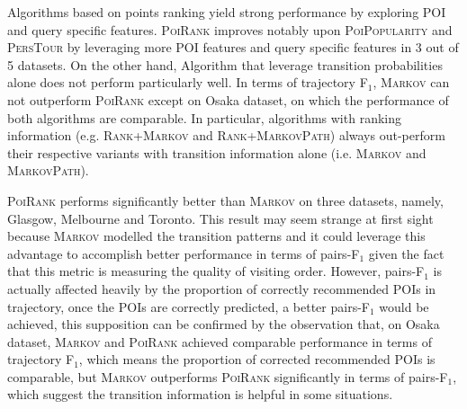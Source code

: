 Algorithms based on points ranking yield strong performance
by exploring POI and query specific features.
%
\textsc{PoiRank} improves notably upon \textsc{PoiPopularity} and \textsc{PersTour}
 by leveraging more POI features and query specific features in 3 out of 5 datasets.
On the other hand, Algorithm that leverage transition probabilities alone does not perform particularly well.
%
In terms of trajectory F$_1$,
\textsc{Markov} can not outperform \textsc{PoiRank} except on Osaka dataset,
on which the performance of both algorithms are comparable.
In particular, algorithms with ranking information (e.g. \textsc{Rank+Markov} and \textsc{Rank+MarkovPath}) always out-perform their respective variants with transition information alone (i.e. \textsc{Markov} and \textsc{MarkovPath}). 

\textsc{PoiRank} performs significantly better than \textsc{Markov} on three datasets, namely,
Glasgow, Melbourne and Toronto.
%
This result may seem strange at first sight because \textsc{Markov} modelled the transition patterns and it could leverage
this advantage to accomplish better performance in terms of pairs-F$_1$ given the fact that this metric is measuring the quality
of visiting order.
However, pairs-F$_1$ is actually affected heavily by the proportion of correctly recommended POIs in trajectory,
once the POIs are correctly predicted, a better pairs-F$_1$ would be achieved,
this supposition can be confirmed by the observation that, on Osaka dataset, \textsc{Markov} and \textsc{PoiRank} achieved
comparable performance in terms of trajectory F$_1$, which means the proportion of corrected recommended POIs is comparable,
but \textsc{Markov} outperforms \textsc{PoiRank} significantly in terms of pairs-F$_1$,
which suggest the transition information is helpful in some situations.

